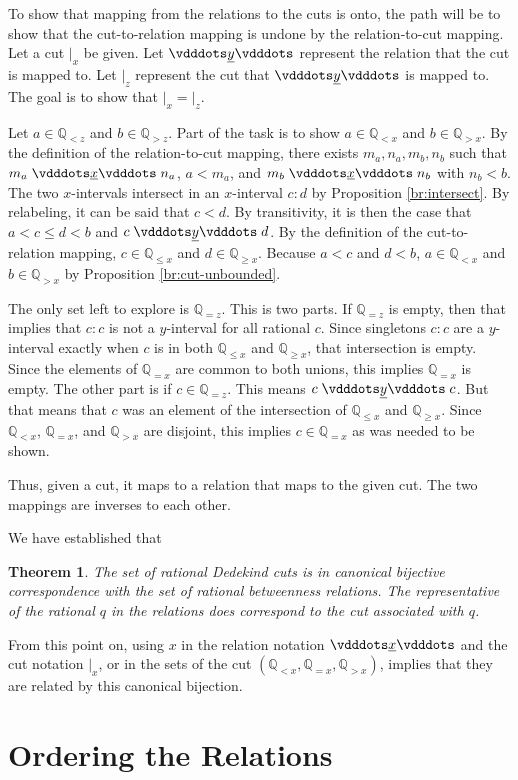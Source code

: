 \documentclass[12pt]{article}
\newtheorem{theorem}{Theorem}
\newcommand{\qcut}[2][x]{\ensuremath{\mathbb{Q}_{#2 #1}}}
\newcommand{\qlt}[1][x]{\qcut[#1]{<}}
\newcommand{\qeq}[1][x]{\qcut[#1]{=}}
\newcommand{\qgt}[1][x]{\qcut[#1]{>}}
\newcommand{\qgeq}[1][x]{\qcut[#1]{\geq}}
\newcommand{\qleq}[1][x]{\qcut[#1]{\leq}}
\newcommand{\cut}[1][x]{{\vert}_{#1} }
\newcommand{\yrel}{\xrel[y]}
\begin{document}
To show that mapping from the relations to the cuts is onto, the path will be to show that the cut-to-relation mapping is undone by the relation-to-cut mapping. Let a cut $\cut$ be given. Let $\yrel$ represent the relation that the cut is mapped to. Let $\cut[z]$ represent the cut that $\yrel$ is mapped to. The goal is to show that $\cut = \cut[z]$.  

Let $a \in \qlt[z]$ and $b \in \qgt[z]$. Part of the task is to show $a \in \qlt$ and $b \in \qgt$. By the definition of the relation-to-cut mapping, there exists $m_a, n_a, m_b, n_b$ such that $m_a \xrel n_a$, $a < m_a$, and $m_b \xrel n_b$ with $n_b < b$. The two $x$-intervals intersect in an $x$-interval $c:d$ by  Proposition \ref{br:intersect}. By relabeling, it can be said that $c < d$. By transitivity, it is then the case that $a < c \leq d < b$ and $c \yrel d$. By the definition of the cut-to-relation mapping, $c \in \qleq$ and $d \in \qgeq$. Because $a < c$ and $ d < b$, $a \in \qlt$ and $b \in \qgt$ by Proposition \ref{br:cut-unbounded}.

The only set left to explore is $\qeq[z]$. This is two parts. If $\qeq[z]$ is empty, then that implies that $c:c$ is not a $y$-interval for all rational $c$. Since singletons $c:c$ are a $y$-interval exactly when $c$ is in both $\qleq$ and $\qgeq$, that intersection is empty. Since the elements of $\qeq$ are common to both unions, this implies $\qeq$ is empty. The other part is if $c \in \qeq[z]$. This means $c \yrel c$. But that means that $c$ was an element of the intersection of $\qleq$ and $\qgeq$. Since $\qlt$, $\qeq$, and $\qgt$ are disjoint, this implies $c \in \qeq$ as was needed to be shown. 

Thus, given a cut, it maps to a relation that maps to the given cut. The two mappings are inverses to each other.

We have established that
\begin{theorem}
    The set of rational Dedekind cuts is in canonical bijective correspondence with the set of rational betweenness relations. The representative of the rational $q$ in the relations does correspond to the cut associated with $q$.
\end{theorem}

From this point on, using $x$ in the relation notation $\xrel$ and the cut notation $\cut$, or in the sets of the cut $(\qlt, \qeq, \qgt)$, implies that they are related by this canonical bijection. 

\section{Ordering the Relations}
\end{document}
